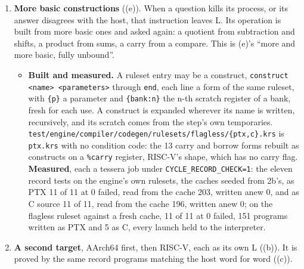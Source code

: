 \begin{enumerate}
\begin{itemize}
\begin{enumerate}
\begin{itemize}
\end{itemize}
\item \textbf{More basic constructions} ((e)). When a question kills its process, or its answer disagrees with the host, that instruction leaves L. Its operation is built from more basic ones and asked again: a quotient from subtraction and shifts, a product from sums, a carry from a compare. This is (e)'s “more and more basic, fully unbound”.

\begin{itemize}
\item \textbf{Built and measured.} A ruleset entry may be a construct, \texttt{construct <name> <parameters>} through \texttt{end}, each line a form of the same ruleset, with \texttt{\{p\}} a parameter and \texttt{\{bank:n\}} the n-th scratch register of a bank, fresh for each use. A construct is expanded wherever its name is written, recursively, and its scratch comes from the step's own temporaries. \texttt{test/\allowbreak{}engine/\allowbreak{}compiler/\allowbreak{}codegen/\allowbreak{}rulesets/\allowbreak{}flagless/\allowbreak{}\{ptx,c\}.\allowbreak{}krs} is \texttt{ptx.\allowbreak{}krs} with no condition code: the 13 carry and borrow forms rebuilt as constructs on a \texttt{\%carry} register, RISC-V's shape, which has no carry flag. \textbf{Measured}, each a tessera job under \texttt{CYCLE\_\allowbreak{}RECORD\_\allowbreak{}CHECK=1}: the eleven record tests on the engine's own rulesets, the caches seeded from 2b's, as PTX 11 of 11 at 0 failed, read from the cache 203, written anew 0, and as C source 11 of 11, read from the cache 196, written anew 0; on the flagless ruleset against a fresh cache, 11 of 11 at 0 failed, 151 programs written as PTX and 5 as C, every launch held to the interpreter.
\end{itemize}
\item \textbf{A second target}, AArch64 first, then RISC-V, each as its own L ((b)). It is proved by the same record programs matching the host word for word ((c)).


\end{enumerate}
\end{itemize}
\end{enumerate}

